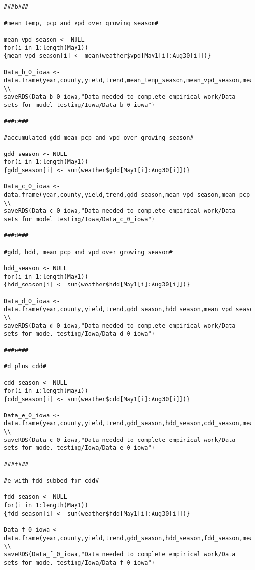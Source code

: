 \begin{lstlisting}
###b###

#mean temp, pcp and vpd over growing season#

mean_vpd_season <- NULL
for(i in 1:length(May1))
{mean_vpd_season[i] <- mean(weather$vpd[May1[i]:Aug30[i]])}

Data_b_0_iowa <- data.frame(year,county,yield,trend,mean_temp_season,mean_vpd_season,mean_pcp_season)
\\
saveRDS(Data_b_0_iowa,"Data needed to complete empirical work/Data sets for model testing/Iowa/Data_b_0_iowa")

###c###

#accumulated gdd mean pcp and vpd over growing season#

gdd_season <- NULL
for(i in 1:length(May1))
{gdd_season[i] <- sum(weather$gdd[May1[i]:Aug30[i]])}

Data_c_0_iowa <- data.frame(year,county,yield,trend,gdd_season,mean_vpd_season,mean_pcp_season)
\\
saveRDS(Data_c_0_iowa,"Data needed to complete empirical work/Data sets for model testing/Iowa/Data_c_0_iowa")

###d###

#gdd, hdd, mean pcp and vpd over growing season#

hdd_season <- NULL
for(i in 1:length(May1))
{hdd_season[i] <- sum(weather$hdd[May1[i]:Aug30[i]])}

Data_d_0_iowa <- data.frame(year,county,yield,trend,gdd_season,hdd_season,mean_vpd_season,mean_pcp_season)
\\
saveRDS(Data_d_0_iowa,"Data needed to complete empirical work/Data sets for model testing/Iowa/Data_d_0_iowa")

###e###

#d plus cdd#

cdd_season <- NULL
for(i in 1:length(May1))
{cdd_season[i] <- sum(weather$cdd[May1[i]:Aug30[i]])}

Data_e_0_iowa <- data.frame(year,county,yield,trend,gdd_season,hdd_season,cdd_season,mean_vpd_season,mean_pcp_season)
\\
saveRDS(Data_e_0_iowa,"Data needed to complete empirical work/Data sets for model testing/Iowa/Data_e_0_iowa")

###f###

#e with fdd subbed for cdd#

fdd_season <- NULL
for(i in 1:length(May1))
{fdd_season[i] <- sum(weather$fdd[May1[i]:Aug30[i]])}

Data_f_0_iowa <- data.frame(year,county,yield,trend,gdd_season,hdd_season,fdd_season,mean_vpd_season,mean_pcp_season)
\\
saveRDS(Data_f_0_iowa,"Data needed to complete empirical work/Data sets for model testing/Iowa/Data_f_0_iowa")


\end{lstlisting}
